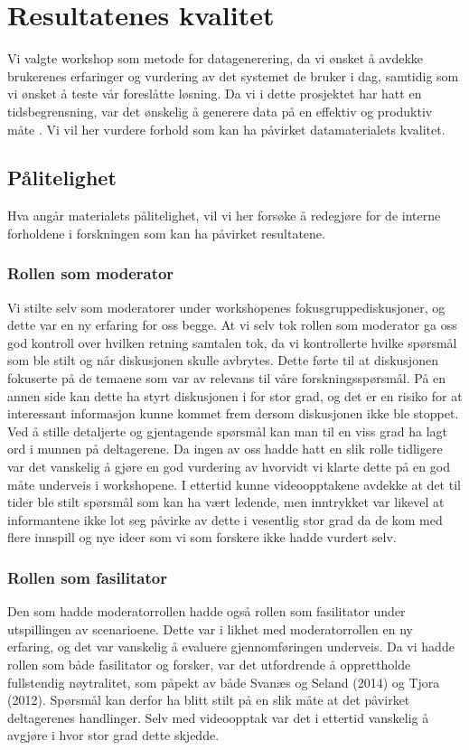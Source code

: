 \section{Resultatenes kvalitet}
\label{chp:analyse}

Vi valgte workshop som metode for datagenerering, da vi ønsket å avdekke brukerenes erfaringer og vurdering av det systemet de bruker i dag, samtidig som vi ønsket å teste vår foreslåtte løsning. Da vi i dette prosjektet har hatt en tidsbegrensning, var det ønskelig å generere data på en effektiv og produktiv måte \cite{Tjora}. Vi vil her vurdere forhold som kan ha påvirket datamaterialets kvalitet.

\subsection{Pålitelighet}
Hva angår materialets pålitelighet, vil vi her forsøke å redegjøre for de interne forholdene i forskningen som kan ha påvirket resultatene.

\subsubsection{Rollen som moderator}
Vi stilte selv som moderatorer under workshopenes fokusgruppediskusjoner, og dette var en ny erfaring for oss begge. At vi selv tok rollen som moderator ga oss god kontroll over hvilken retning samtalen tok, da vi kontrollerte hvilke spørsmål som ble stilt og når diskusjonen skulle avbrytes. Dette førte til at diskusjonen fokuserte på de temaene som var av relevans til våre forskningsspørsmål. På en annen side kan dette ha styrt diskusjonen i for stor grad, og det er en risiko for at interessant informasjon kunne kommet frem dersom diskusjonen ikke ble stoppet. Ved å stille detaljerte og gjentagende spørsmål kan man til en viss grad ha lagt ord i munnen på deltagerene. Da ingen av oss hadde hatt en slik rolle tidligere var det vanskelig å gjøre en god vurdering av hvorvidt vi klarte dette på en god måte underveis i workshopene. I ettertid kunne videoopptakene avdekke at det til tider ble stilt spørsmål som kan ha vært ledende, men inntrykket var likevel at informantene ikke lot seg påvirke av dette i vesentlig stor grad da de kom med flere innspill og nye ideer som vi som forskere ikke hadde vurdert selv.

\subsubsection{Rollen som fasilitator}
Den som hadde moderatorrollen hadde også rollen som fasilitator under utspillingen av scenarioene. Dette var i likhet med moderatorrollen en ny erfaring, og det var vanskelig å evaluere gjennomføringen underveis. Da vi hadde rollen som både fasilitator og forsker, var det utfordrende å opprettholde fullstendig nøytralitet, som påpekt av både Svanæs og Seland (2014) og Tjora (2012). Spørsmål kan derfor ha blitt stilt på en slik måte at det påvirket deltagerenes handlinger. Selv med videoopptak var det i ettertid vanskelig å avgjøre i hvor stor grad dette skjedde. 

